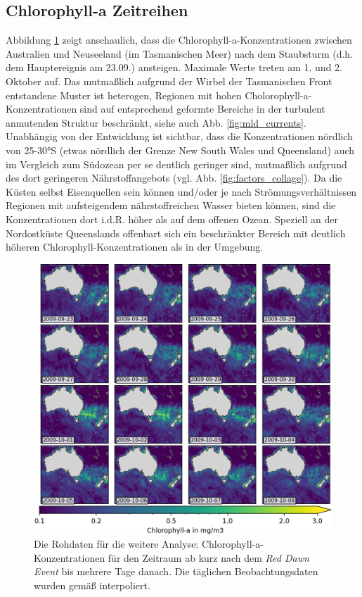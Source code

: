 \documentclass[12pt,a4paper,onecolumn,headheight=30pt]{scrartcl}
\begin{document}
\subsection{Chlorophyll-a Zeitreihen} \label{sec:chla_zeitreihen}
\sloppy 
Abbildung \ref{fig:chla_collage} zeigt anschaulich, dass die Chlorophyll-a-Konzentrationen zwischen Australien und Neuseeland (im Tasmanischen Meer) nach dem Staubsturm (d.h. dem Hauptereignis am 23.09.) ansteigen. Maximale Werte treten am 1. und 2. Oktober auf. Das mutmaßlich aufgrund der Wirbel der Tasmanischen Front \citep{Gabric.2016} entstandene Muster ist heterogen, Regionen mit hohen Cholorophyll-a-Konzentrationen sind auf entsprechend geformte Bereiche in der turbulent anmutenden Struktur beschränkt, siehe auch Abb. \ref{fig:mld_currents}. Unabhängig von der Entwicklung ist sichtbar, dass die Konzentrationen nördlich von 25-30°S (etwas nördlich der Grenze New South Wales und Queensland) auch im Vergleich zum Südozean per se deutlich geringer sind, mutmaßlich aufgrund des dort geringeren Nährstoffangebots (vgl. Abb. \ref{fig:factors_collage}). Da die Küsten selbst Eisenquellen sein können und/oder je nach Strömungsverhältnissen Regionen mit aufsteigendem nährstoffreichen Wasser bieten können, sind die Konzentrationen dort i.d.R. höher als auf dem offenen Ozean. Speziell an der Nordostküste Queenslands offenbart sich ein beschränkter Bereich mit deutlich höheren Chlorophyll-Konzentrationen als in der Umgebung. 
\begin{figure}[htbp]
\includegraphics[width=\textwidth]{bilder/chl_collage.png}
\caption{Die Rohdaten für die weitere Analyse: Chlorophyll-a-Konzentrationen für den Zeitraum ab kurz nach dem \textit{Red Dawn Event} bis mehrere Tage danach. Die täglichen Beobachtungsdaten wurden gemäß \cite{Saulquin.2019} interpoliert.} \label{fig:chla_collage}
\end{figure}
\end{document}
